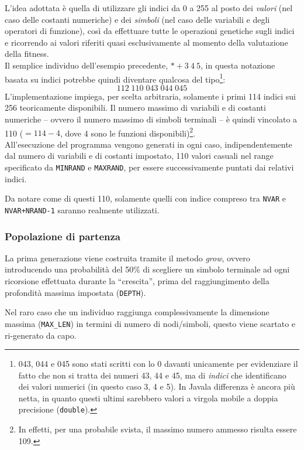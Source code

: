 \documentclass{../llncs}
\newcommand{\java}{\textsf{Java}}
\begin{document}
L'idea adottata è quella di utilizzare gli indici da 0 a 255 al posto dei \emph{valori} (nel caso delle costanti numeriche) e dei \emph{simboli} (nel caso delle variabili e degli operatori di funzione), così da effettuare tutte le operazioni genetiche sugli indici e ricorrendo ai valori riferiti quasi esclusivamente al momento della valutazione della fitness.\\

Il semplice individuo dell'esempio precedente, $* + 3\:4\:5$, in questa notazione basata su indici potrebbe quindi diventare qualcosa del tipo\footnote{043, 044 e 045 sono stati scritti con lo 0 davanti unicamente per evidenziare il fatto che non si tratta dei numeri 43, 44 e 45, ma di \emph{indici} che identificano dei valori numerici (in questo caso 3, 4 e 5). In \java la differenza è ancora più netta, in quanto questi ultimi sarebbero valori a virgola mobile a doppia precisione (\texttt{double}).}:
\[
112\;110\;043\;044\;045
\]
L'implementazione impiega, per scelta arbitraria, solamente i primi 114 indici sui 256 teoricamente disponibili. Il numero massimo di variabili e di costanti numeriche -- ovvero il numero massimo di simboli terminali -- è quindi vincolato a 110 ($=114-4$, dove 4 sono le funzioni disponibili)\footnote{In effetti, per una probabile svista, il massimo numero ammesso risulta essere 109.}.\\

All'esecuzione del programma vengono generati in ogni caso, indipendentemente dal numero di variabili e di costanti impostato, 110 valori casuali nel range specificato da \texttt{MINRAND} e \texttt{MAXRAND}, per essere successivamente puntati dai relativi indici.

Da notare come di questi 110, solamente quelli con indice compreso tra \texttt{NVAR} e \texttt{NVAR+NRAND-1} saranno realmente utilizzati.

\subsubsection{Popolazione di partenza}
La prima generazione viene costruita tramite il metodo \emph{grow}, ovvero introducendo una probabilità del 50\% di scegliere un simbolo terminale ad ogni ricorsione effettuata durante la ``crescita'', prima del raggiungimento della profondità massima impostata (\texttt{DEPTH}).

Nel raro caso che un individuo raggiunga complessivamente la dimensione massima (\texttt{MAX{\_}LEN}) in termini di numero di nodi/simboli, questo viene scartato e ri-generato da capo.\\
\end{document}
